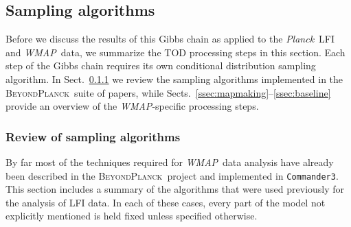 \documentclass[twocolumn]{../../common/aa}
\def\WMAP{\emph{WMAP}}
\def\Planck{\emph{Planck}}
\def\commanderthree{\texttt{Commander3}}
\newcommand{\bp}{\textsc{BeyondPlanck}}
\begin{document}





\subsection{Sampling algorithms}
\label{sec:algorithms}

Before we discuss the results of this Gibbs chain as applied to the \Planck\ LFI and \WMAP\ data, we summarize the TOD processing steps in this section. Each step of the Gibbs chain requires its own conditional distribution sampling algorithm. In Sect.~\ref{ssec:oldsamplers} we review the sampling algorithms implemented in the \bp\ suite of papers, while Sects.~\ref{ssec:mapmaking}--\ref{ssec:baseline} provide an overview of the \WMAP-specific processing steps.

\subsubsection{Review of sampling algorithms}
\label{ssec:oldsamplers}


By far most of the techniques required for \WMAP\ data analysis have already been  described in the \bp\ project and implemented in \commanderthree. This section includes a summary of the algorithms that were used previously for the analysis of LFI data. In each of these cases, every part of the model not explicitly mentioned is held fixed unless specified otherwise.
\end{document}
